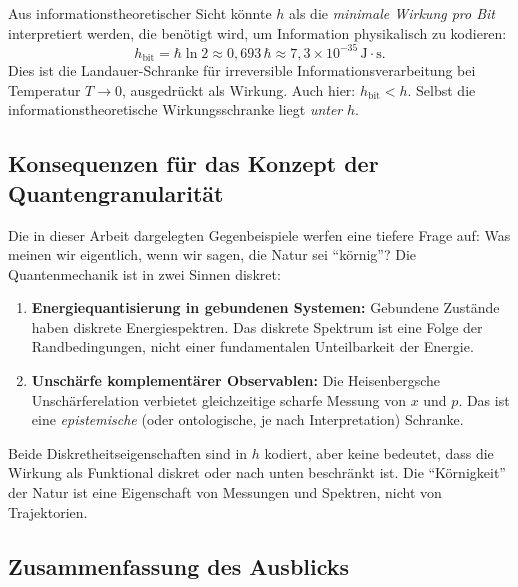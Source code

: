 ﻿\documentclass[12pt,a4paper]{article}
\theoremstyle{plain}
\theoremstyle{definition}
\theoremstyle{remark}
\begin{document}
Aus informationstheoretischer Sicht könnte $h$ als die \emph{minimale Wirkung pro Bit}
interpretiert werden, die benötigt wird, um Information physikalisch zu kodieren:
\begin{equation}
  h_{\mathrm{bit}} = \hbar \ln 2 \approx 0{,}693\,\hbar \approx 7{,}3\times 10^{-35}\,\mathrm{J{\cdot}s}.
\end{equation}
Dies ist die Landauer-Schranke für irreversible Informationsverarbeitung bei Temperatur
$T \to 0$, ausgedrückt als Wirkung. Auch hier: $h_{\mathrm{bit}} < h$. Selbst die
informationstheoretische Wirkungsschranke liegt \emph{unter} $h$.

\subsection{Konsequenzen für das Konzept der Quantengranularität}

Die in dieser Arbeit dargelegten Gegenbeispiele werfen eine tiefere Frage auf: Was
meinen wir eigentlich, wenn wir sagen, die Natur sei ``körnig''? Die Quantenmechanik
ist in zwei Sinnen diskret:

\begin{enumerate}[leftmargin=2em]
  \item \textbf{Energiequantisierung in gebundenen Systemen:} Gebundene Zustände haben
    diskrete Energiespektren. Das diskrete Spektrum ist eine Folge der Randbedingungen,
    nicht einer fundamentalen Unteilbarkeit der Energie.
  \item \textbf{Unschärfe komplementärer Observablen:} Die Heisenbergsche Unschärferelation
    verbietet gleichzeitige scharfe Messung von $x$ und $p$. Das ist eine
    \emph{epistemische} (oder ontologische, je nach Interpretation) Schranke.
\end{enumerate}

Beide Diskretheitseigenschaften sind in $h$ kodiert, aber keine bedeutet, dass die
Wirkung als Funktional diskret oder nach unten beschränkt ist. Die ``Körnigkeit'' der
Natur ist eine Eigenschaft von Messungen und Spektren, nicht von Trajektorien.

\subsection{Zusammenfassung des Ausblicks}
\end{document}
